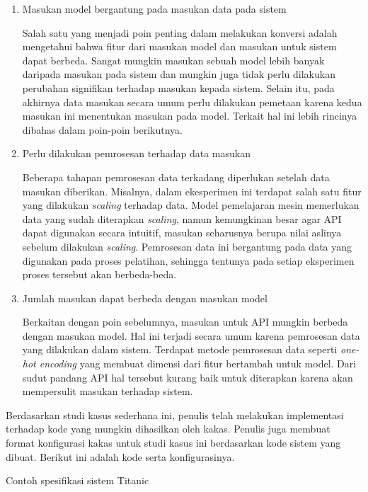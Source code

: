 \begin{enumerate}
	\item Masukan model bergantung pada masukan data pada sistem 
	
	Salah satu yang menjadi poin penting dalam melakukan konversi adalah mengetahui bahwa fitur dari masukan model dan masukan untuk sistem dapat berbeda.
	Sangat mungkin masukan sebuah model lebih banyak daripada masukan pada sistem dan mungkin juga tidak perlu dilakukan perubahan signifikan terhadap masukan kepada sistem.
	Selain itu, pada akhirnya data masukan secara umum perlu dilakukan pemetaan karena kedua masukan ini menentukan masukan pada model.
	Terkait hal ini lebih rincinya dibahas dalam poin-poin berikutnya.

	\item Perlu dilakukan pemrosesan terhadap data masukan
	
	Beberapa tahapan pemrosesan data terkadang diperlukan setelah data masukan diberikan.
	Misalnya, dalam ekesperimen ini terdapat salah satu fitur yang dilakukan \textit{scaling} terhadap data.
	Model pemelajaran mesin memerlukan data yang sudah diterapkan \textit{scaling}, namun kemungkinan besar agar API dapat digunakan secara intuitif, masukan seharusnya berupa nilai aslinya sebelum dilakukan \textit{scaling}.
	Pemrosesan data ini bergantung pada data yang digunakan pada proses pelatihan, sehingga tentunya pada setiap eksperimen proses tersebut akan berbeda-beda.
	
	\item Jumlah masukan dapat berbeda dengan masukan model
	
	Berkaitan dengan poin sebelumnya, masukan untuk API mungkin berbeda dengan masukan model.
	Hal ini terjadi secara umum karena pemrosesan data yang dilakukan dalam sistem.
	Terdapat metode pemrosesan data seperti \textit{one-hot encoding} yang membuat dimensi dari fitur bertambah untuk model.
	Dari sudut pandang API hal tersebut kurang baik untuk diterapkan karena akan mempersulit masukan terhadap sistem.
\end{enumerate}

Berdasarkan studi kasus sederhana ini, penulis telah melakukan implementasi terhadap kode yang mungkin dihasilkan oleh kakas.
Penulis juga membuat format konfigurasi kakas untuk studi kasus ini berdasarkan kode sistem yang dibuat.
Berikut ini adalah kode serta konfigurasinya.

\begin{code}
	\caption{Contoh spesifikasi sistem Titanic}
	\label{listing:14}
\end{code}

